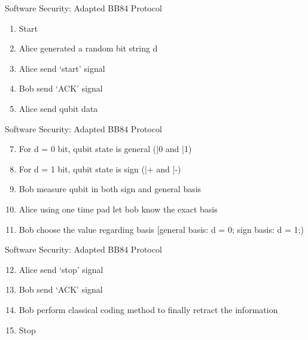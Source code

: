 \documentclass{beamer}
\begin{document}




\begin{frame}{Software Security: Adapted BB84 Protocol \cite{qu_iot_2019}}
    \begin{enumerate}
        \item {Start}
        \item {Alice generated a random bit string d}
        \item {Alice send ‘start’ signal}
        \item {Bob send ‘ACK’ signal}
        \item {Alice send qubit data}
    \end{enumerate}
\end{frame}

\begin{frame}{Software Security: Adapted BB84 Protocol \cite{qu_iot_2019}}
    \begin{enumerate}
        \setcounter{enumi}{6}
        \item {For d = 0 bit, qubit state is general (|0 and |1)}
        \item {For d = 1 bit, qubit state is sign (|+ and |-)}
        \item {Bob measure qubit in both sign and general basis}
        \item {Alice using one time pad let bob know the exact basis}
        \item {Bob choose the value regarding basis [general basis: d = 0; sign basis: d = 1;)}
    \end{enumerate}
\end{frame}

\begin{frame}{Software Security: Adapted BB84 Protocol \cite{qu_iot_2019}}
    \begin{enumerate}
    \setcounter{enumi}{11}
        \item {Alice send ‘stop’ signal}
        \item {Bob send ‘ACK’ signal}
        \item {Bob perform classical coding method to finally retract the information}
        \item {Stop}
    \end{enumerate}
\end{frame}
\end{document}
